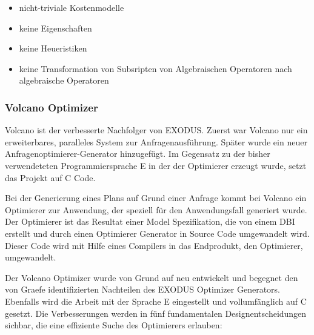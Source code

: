\begin{itemize}
\item nicht-triviale Kostenmodelle
\item keine Eigenschaften
\item keine Heueristiken
\item keine Transformation von Subsripten von Algebraischen Operatoren nach algebraische Operatoren
\end{itemize}


\subsubsection{Volcano Optimizer}

Volcano ist der verbesserte Nachfolger von EXODUS. Zuerst war Volcano nur ein erweiterbares, paralleles System zur Anfragenausführung. Später wurde ein neuer Anfragenoptimierer-Generator hinzugefügt. Im Gegensatz zu der bisher verwendeteten Programmiersprache E in der der Optimierer erzeugt wurde, setzt das Projekt auf C Code. 


Bei der Generierung eines Plans auf Grund einer Anfrage kommt bei Volcano ein Optimierer zur Anwendung, der speziell für den Anwendungsfall generiert wurde. Der Optimierer ist das Resultat einer Model Spezifikation, die von einem \ac{DBI} erstellt und durch einen Optimierer Generator in Source Code umgewandelt wird. Dieser Code wird mit Hilfe eines Compilers in das Endprodukt, den Optimierer, umgewandelt.


Der Volcano Optimizer wurde von Grund auf neu entwickelt und begegnet den von Graefe identifizierten Nachteilen des EXODUS Optimizer Generators. Ebenfalls wird die Arbeit mit der Sprache E eingestellt und vollumfänglich auf C gesetzt. Die Verbesserungen werden in fünf fundamentalen Designentscheidungen\cite{graefe1993volcano} sichbar, die eine effiziente Suche des Optimierers erlauben:


